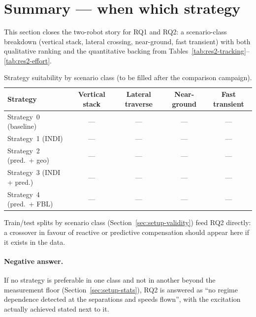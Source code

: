 \section{Summary --- when which strategy}
\label{sec:res2-summary}

This section closes the two-robot story for RQ1 and RQ2: a scenario-class breakdown (vertical stack,
lateral crossing, near-ground, fast transient) with both qualitative ranking and the quantitative
backing from Tables~\ref{tab:res2-tracking}--\ref{tab:res2-effort}.


\begin{table}[t]
  \centering
  \caption{Strategy suitability by scenario class (to be filled after the comparison campaign).}
  \label{tab:res2-when-which}
  \small
  \begin{tabular}{@{}lcccc@{}}
    \toprule
    Strategy & Vertical stack & Lateral traverse & Near-ground & Fast transient \\
    \midrule
    Strategy~0 (baseline) & --- & --- & --- & --- \\
    Strategy~1 (INDI) & --- & --- & --- & --- \\
    Strategy~2 (pred.\ + geo) & --- & --- & --- & --- \\
    Strategy~3 (INDI + pred.) & --- & --- & --- & --- \\
    Strategy~4 (pred.\ + FBL) & --- & --- & --- & --- \\
    \bottomrule
  \end{tabular}
\end{table}

Train/test splits by scenario class (Section~\ref{sec:setup-validity}) feed RQ2 directly: a crossover
in favour of reactive or predictive compensation should appear here if it exists in the data.
\paragraph{Negative answer.} If no strategy is preferable in one class and not in another beyond the
measurement floor (Section~\ref{sec:setup-stats}), RQ2 is answered as ``no regime dependence detected at the separations and
speeds flown'', with the excitation actually achieved stated next to it.
